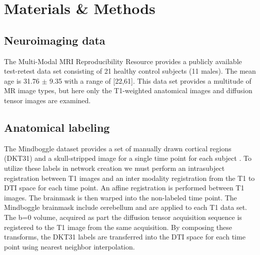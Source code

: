 \documentclass{frontiersSCNS} %
\begin{document}
\section{Materials \& Methods}

\subsection{Neuroimaging data}
The Multi-Modal MRI Reproducibility Resource \citep{Landman2011}
provides a publicly available test-retest data set consisting of 21
healthy control subjects (11 males). The mean
age is 31.76 $\pm$ 9.35 with a range of [22,61]. This data set provides a
multitude of MR image types, but here only the T1-weighted anatomical images and diffusion
tensor images are examined.

\subsection{Anatomical labeling}
The Mindboggle dataset provides a set of manually drawn cortical regions (DKT31) and a skull-stripped image
for a single time point for each subject \citep{Klein2012}. To utilize these labels in network creation we must perform an intrasubject
registration between T1 images and an inter modality registration from the T1 to DTI space for 
each time point. An affine registration is performed between T1 images. The brainmask is then warped into
the non-labeled time point. The Mindboggle brainmask include cerebellum and are applied to each T1 data set. The b=0
volume, acquired as part the diffusion tensor acquisition sequence is registered to the T1 image from the same acquisition. By composing
these transforms, the DKT31 labels are transferred into the DTI space for each time point using nearest neighbor interpolation. 
\end{document}
